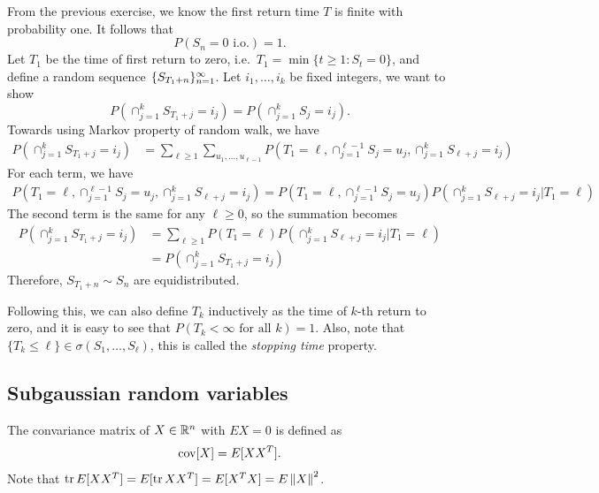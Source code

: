 \documentclass[a4paper]{article}
\begin{document}
\begin{eg}[recurrence]
  From the previous exercise, we know the first return time $T$
  is finite with probability one. It follows that
  \[
    P \left( S_n = 0 \text{ i.o.} \right) = 1.
  \]
  Let $T_1$ be the time of first return to zero, i.e.\
  $T_1 = \min \{ t \geq 1 : S_t = 0 \}$, and define
  a random sequence $\{ S_{T_1 + n} \}_{n=1}^\infty$.
  Let $i_1, \dots, i_k$ be fixed integers, we want to show
  \[
    P \left( \cap_{j=1}^k S_{T_1 + j} = i_j \right)
    = P \left( \cap_{j=1}^k S_j = i_j \right).
  \]
  Towards using Markov property of random walk, we have
  \begin{align*}
    P \left( \cap_{j=1}^k S_{T_1 + j} = i_j \right)
     & = \sum_{\ell \geq 1}  \sum_{u_1, \dots, u_{\ell - 1}}
    P \left( T_1 = \ell, \cap_{j=1}^{\ell - 1} S_j = u_j,
    \cap_{j=1}^k S_{\ell+ j} = i_j \right)
  \end{align*}
  For each term, we have
  \begin{align*}
    P \left( T_1 = \ell, \cap_{j=1}^{\ell - 1} S_j = u_j,
    \cap_{j=1}^k S_{\ell + j} = i_j \right)
    = P \left( T_1 = \ell, \cap_{j=1}^{\ell - 1} S_j = u_j \right)
    P \left( \cap_{j=1}^k S_{\ell + j} = i_j | T_1 = \ell \right)
  \end{align*}
  The second term is the same for any $\ell \geq 0$, so the summation
  becomes
  \begin{align*}
    P(\cap_{j=1}^k S_{T_1 + j} = i_j)
     & = \sum_{\ell \geq 1} P(T_1 = \ell)
    P \left( \cap_{j=1}^k S_{\ell + j} = i_j | T_1 = \ell \right) \\
     & = P(\cap_{j=1}^k S_{T_1 + j} = i_j)
  \end{align*}
  Therefore, $S_{T_1 + n} \sim S_n$ are equidistributed.

  Following this, we can also define $T_k$ inductively
  as the time of $k$-th return to zero, and it is easy to
  see that $P (T_k < \infty \text{ for all $k$}) = 1$. Also, note that
  $\{ T_k \leq \ell \} \in \sigma (S_1, \dots, S_\ell)$, this is
  called the \emph{stopping time} property.
\end{eg}

\subsection{Subgaussian random variables}

The convariance matrix of $X \in \mathbb{R}^n$ with $E X = 0$ is defined as
\[
  \operatorname{cov} [X] = E [X X^T].
\]
Note that $\operatorname{tr} E[X X^T] =
  E [\operatorname{tr} X X^T] = E [X^T X] = E \left\lVert X\right\rVert^2$.
\end{document}
